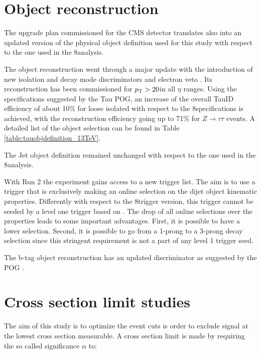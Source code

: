 \section{Object reconstruction}

The upgrade plan commissioned for the CMS detector translates also into an updated version of the physical object definition used for this study with respect to the one used in the 8\tev analysis.

The \hadtau object reconstruction went through a major update with the introduction of new isolation and decay mode discriminators and electron veto \cite{bib:TauID_13tev}. Its reconstruction has been commissioned for $p_{\text{T}} > 20$\gev in all $\eta$ ranges. Using the specifications suggested by the Tau POG, an increase of the overall TauID efficiency of about 10\% for loose isolated \hadtau with respect to the 8\tev specifications is achieved, with the reconstruction efficiency going up to 71\% for $Z \longrightarrow\tau\tau$ events\cite{bib:TauID_13tev}. A detailed list of the \hadtau object selection can be found in Table \ref{table:tauobjdefinition_13TeV}. 

The Jet object definition remained unchanged with respect to the one used in the 8\tev analysis.  

With Run 2 the experiment gains access to a new trigger list. The aim is to use a trigger that is exclusively making an online selection on the dijet object kinematic properties. Differently with respect to the 8\tev trigger version, this trigger cannot be seeded by a level one trigger based on \met. The drop of all online selections over the \hadtau properties leads to some important advantages. First, it is possible to have a lower \hadtau \pt selection. Second, it is possible to go from a 1-prong to a 3-prong decay selection since this stringent requirement is not a part of any level 1 trigger seed. 

The b-tag object reconstruction has an updated discriminator as suggested by the POG \cite{bib:BJetID_13tev}.

\section{Cross section limit studies}

The aim of this study is to optimize the event cuts is order to exclude signal at the lowest cross section measurable. A cross section limit is made by requiring the so called significance $\alpha$ to:

